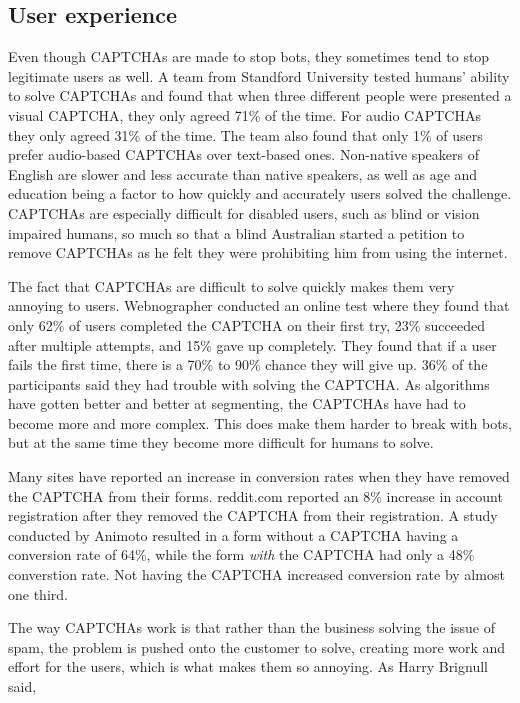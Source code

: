 \documentclass[a4paper]{IEEEtran}
\begin{document}
\subsection{User experience}
Even though CAPTCHAs are made to stop bots, they sometimes tend to stop legitimate users as well. A team from Standford University tested humans' ability to solve CAPTCHAs and found that when three different people were presented a visual CAPTCHA, they only agreed 71\% of the time. For audio CAPTCHAs they only agreed 31\% of the time\cite{humans}. The team also found that only 1\% of users prefer audio-based CAPTCHAs over text-based ones. Non-native speakers of English are slower and less accurate than native speakers, as well as age and education being a factor to how quickly and accurately users solved the challenge. CAPTCHAs are especially difficult for disabled users, such as blind or vision impaired humans, so much so that a blind Australian started a petition to remove CAPTCHAs as he felt they were prohibiting him from using the internet\cite{blind}.

The fact that CAPTCHAs are difficult to solve quickly makes them very annoying to users. 
Webnographer conducted an online test where they found that only 62\% of users completed the CAPTCHA on their first try, 23\% succeeded after multiple attempts, and 15\% gave up completely\cite{webnographer}. They found that if a user fails the first time, there is a 70\% to 90\% chance they will give up. 36\% of the participants said they had trouble with solving the CAPTCHA. As algorithms have gotten better and better at segmenting, the CAPTCHAs have had to become more and more complex. This does make them harder to break with bots, but at the same time they become more difficult for humans to solve. 

Many sites have reported an increase in conversion rates when they have removed the CAPTCHA from their forms. reddit.com reported an 8\% increase in account registration after they removed the CAPTCHA from their registration\cite{reddit}. A study conducted by Animoto resulted in a form without a CAPTCHA having a conversion rate of 64\%, while the form \textit{with} the CAPTCHA had only a 48\% converstion rate. Not having the CAPTCHA increased conversion rate by almost one third\cite{animoto}. 

The way CAPTCHAs work is that rather than the business solving the issue of spam, the problem is pushed onto the customer to solve, creating more work and effort for the users, which is what makes them so annoying. As Harry Brignull said\cite{brignull},
\end{document}
